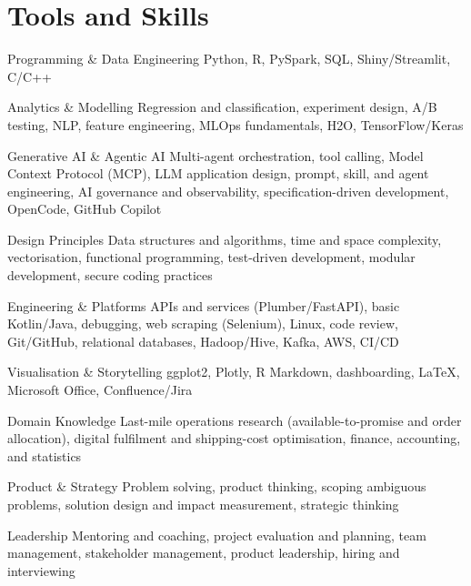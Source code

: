 \documentclass[11pt,a4paper]{moderncv}
\begin{document}
\hypertarget{tools-and-skills}{
\section{Tools and Skills}\label{tools-and-skills}}

\nopagebreak
    {Programming \& Data Engineering}
    {Python, R, PySpark, SQL, Shiny/Streamlit, C/C++}
    {}{}{}

    {Analytics \& Modelling}
    {Regression and classification, experiment design, A/B testing, NLP, feature engineering, MLOps fundamentals, H2O, TensorFlow/Keras}
    {}{}{}

    {Generative AI \& Agentic AI}
    {Multi-agent orchestration, tool calling, Model Context Protocol (MCP), LLM application design, prompt, skill, and agent engineering, AI governance and observability, specification-driven development, OpenCode, GitHub Copilot}
    {}{}{}

    {Design Principles}
    {Data structures and algorithms, time and space complexity, vectorisation, functional programming, test-driven development, modular development, secure coding practices}
    {}{}{}

    {Engineering \& Platforms}
    {APIs and services (Plumber/FastAPI), basic Kotlin/Java, debugging, web scraping (Selenium), Linux, code review, Git/GitHub, relational databases, Hadoop/Hive, Kafka, AWS, CI/CD}
    {}{}{}

    {Visualisation \& Storytelling}
    {ggplot2, Plotly, R Markdown, dashboarding, LaTeX, Microsoft Office, Confluence/Jira}
    {}{}{}

    {Domain Knowledge}
    {Last-mile operations research (available-to-promise and order allocation), digital fulfilment and shipping-cost optimisation, finance, accounting, and statistics}
    {}{}{}

    {Product \& Strategy}
    {Problem solving, product thinking, scoping ambiguous problems, solution design and impact measurement, strategic thinking}
    {}{}{}

    {Leadership}
    {Mentoring and coaching, project evaluation and planning, team management, stakeholder management, product leadership, hiring and interviewing}
    {}{}{}
\end{document}
